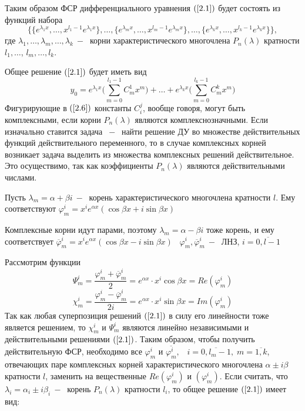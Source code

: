 Таким образом ФСР дифференциального уравнения $(\ref{2.1})$ будет состоять из функций набора
$$ \Bigg\{\{e^{\lambda_1 x}, \dots , x^{l_1-1}e^{\lambda_1 x}\}, \dots, \{e^{\lambda_mx}, \dots, x^{l_m-1 }e^{\lambda_mx}\}, \dots, \{e^{\lambda_k x}, \dots, x^{l_k-1}e^{\lambda_k x}\}\Bigg\},$$
где $\lambda_1, \dots, \lambda_m, \dots, \lambda_k~-~$ корни характеристического многочлена $P_n(\lambda)$ кратности $l_1, \dots$, $l_m, \dots, l_k$.\par
Общее решение $(\ref{2.1})$ будет иметь вид
\begin{equation}
    \tag{2.6}
    \label{2.6}
    y_0=e^{\lambda_1x}\Big(\displaystyle\sum_{m=0}^{l_1-1}C_m^1x^m\Big)+\dots+e^{\lambda_kx}\Big(\displaystyle\sum_{m=0}^{l_k-1}C_m^kx^m\Big)
\end{equation}
Фигурирующие в $(\ref{2.6})$ константы $C_i^j$, вообще говоря, могут быть комплексными, если корни $P_n(\lambda)$ являются комплекснозначными. Если изначально ставится задача $~-~$ найти решение ДУ во множестве действительных функций действительного переменного, то в случае комплексных корней возникает задача выделить из множества комплексных решений действительное. Это осуществимо, так как коэффициенты $P_n(\lambda)$ являются действительными числами.\par
Пусть $\lambda_m=\alpha+\beta i ~-~$ корень характеристического многочлена кратности $l$. Ему соответствуют $\varphi_m^i=x^ie^{\alpha x}(\cos{\beta x}+i\sin{\beta x}) $
\par

Комплексные корни идут парами, поэтому $\lambda_m=\alpha-\beta i$ тоже корень, и ему соответствует 
$\overline{\varphi}_m^i=x^ie^{\alpha x}(\cos{\beta x}-i\sin{\beta x})\;\;\;\varphi^i_m, \overline{\varphi}_m^i~-~$ ЛНЗ, $i=\overline{0, l-1}$\par
Рассмотрим функции $$\Psi_m^i =\frac{\varphi_m^i+\overline{\varphi}_m^i}{2}=e^{\alpha x}\cdot x^i\cos{\beta x}= Re(\varphi^i_m)$$
$$\chi_m^i =\frac{\varphi_m^i-\overline{\varphi}_m^i}{2i}=e^{\alpha x}\cdot x^i\sin{\beta x}= Im(\varphi^i_m)$$
Так как любая суперпозиция решений $(\ref{2.1})$ в силу его линейности тоже является решением, то $\chi_m^i$ и $\Psi_m^i$ являются линейно независимыми и действительными решениями $(\ref{2.1})$. Таким образом, чтобы получить действительную ФСР, необходимо все $\varphi_m^i$ и $\overline{\varphi_m^i}, \;\;\; i=\overline{0, l_m-1}, \; m=\overline{1, k} $, отвечающих паре комплексных корней характеристического многочлена $\alpha \pm i\beta $ кратности $l$, заменить на вещественные $Re(\varphi_m^i)$ и $(\varphi_m^i)$. Если считать, что $\lambda_i=\alpha_i\pm i\beta_i~-~$ корень $P_n(\lambda)$ кратности $l_i$, то общее решение $(\ref{2.1})$ имеет вид:


